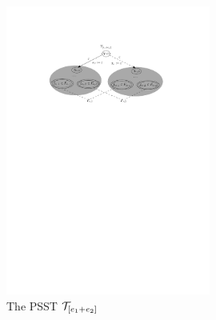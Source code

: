 		\begin{figure}[ht]
		\vspace{-2mm}
			\centering
			\includegraphics[width = 0.6\textwidth]{reg2pfa-1.pdf}
			\caption{The PSST $\mathcal{T}_{[e_1+e_2]}$}
			\label{fig-reg2pfa-1}
			\vspace{-4mm}
		\end{figure}  


